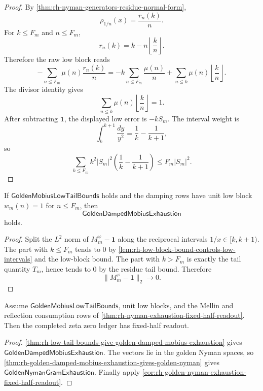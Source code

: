 \begin{proof}
By \autoref{thm:rh-nyman-generators-residue-normal-form},
$$
\rho_{1/n}(x)=\frac{r_n(k)}{n}.
$$
For $k\le F_m$ and $n\le F_m$,
$$
r_n(k)=k-n\left\lfloor\frac{k}{n}\right\rfloor.
$$
Therefore the raw low block reads
$$
-
\sum_{n\le F_m}\mu(n)\frac{r_n(k)}{n}
=
-
k\sum_{n\le F_m}\frac{\mu(n)}{n}
+
\sum_{n\le k}\mu(n)\left\lfloor\frac{k}{n}\right\rfloor.
$$
The divisor identity gives
$$
\sum_{n\le k}\mu(n)\left\lfloor\frac{k}{n}\right\rfloor=1.
$$
After subtracting $\mathbf 1$, the displayed low error is $-kS_m$.
The interval weight is
$$
\int_k^{k+1}\frac{dy}{y^2}
=
\frac{1}{k}-\frac{1}{k+1},
$$
so
$$
\sum_{k\le F_m}
k^2|S_m|^2
\left(
\frac{1}{k}-\frac{1}{k+1}
\right)
\le
F_m|S_m|^2.
$$
\end{proof}

\begin{theorem}
\label{thm:rh-low-tail-bounds-give-golden-damped-mobius-exhaustion}
If $\mathsf{GoldenMobiusLowTailBounds}$ holds and the damping rows have
unit low block $w_m(n)=1$ for $n\le F_m$, then
$$
\mathsf{GoldenDampedMobiusExhaustion}
$$
holds.
\end{theorem}

\begin{proof}
Split the $L^2$ norm of $M_m^{\varphi}-\mathbf 1$ along the reciprocal
intervals $1/x\in[k,k+1)$.  The part with $k\le F_m$ tends to $0$ by
\autoref{lem:rh-low-block-bound-controls-low-intervals} and the
low-block bound.  The part with $k>F_m$ is exactly the tail quantity
$T_m$, hence tends to $0$ by the residue tail bound.  Therefore
$$
\|M_m^{\varphi}-\mathbf 1\|_2\to0.
$$
\end{proof}

\begin{corollary}
\label{cor:rh-low-tail-bounds-fixed-half-readout}
Assume $\mathsf{GoldenMobiusLowTailBounds}$, unit low blocks, and the
Mellin and reflection consumption rows of
\autoref{thm:rh-nyman-exhaustion-fixed-half-readout}.  Then the
completed zeta zero ledger has fixed-half readout.
\end{corollary}

\begin{proof}
\autoref{thm:rh-low-tail-bounds-give-golden-damped-mobius-exhaustion}
gives $\mathsf{GoldenDampedMobiusExhaustion}$.  The vectors lie in the
golden Nyman spaces, so
\autoref{thm:rh-golden-damped-mobius-exhaustion-gives-golden-nyman}
gives $\mathsf{GoldenNymanGramExhaustion}$.  Finally apply
\autoref{cor:rh-golden-nyman-exhaustion-fixed-half-readout}.
\end{proof}

